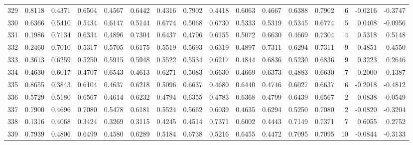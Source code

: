 \begin{tabular}{lrrrrrrrrrrrrrrr}
329 &      0.8118 &  0.4371 &  0.6504 &  0.4567 &  0.6442 &  0.4316 &  0.7902 &  0.4418 &  0.6063 &  0.4667 &   0.6388 &     0.7902 &      6 &                   -0.0216 &                    -0.3747 \\
330 &      0.6366 &  0.5410 &  0.5434 &  0.6147 &  0.5144 &  0.6774 &  0.5068 &  0.6730 &  0.5333 &  0.5319 &   0.5345 &     0.6774 &      5 &                    0.0408 &                    -0.0956 \\
331 &      0.1986 &  0.7134 &  0.6334 &  0.4896 &  0.7304 &  0.6437 &  0.4796 &  0.6155 &  0.5072 &  0.6630 &   0.4669 &     0.7304 &      4 &                    0.5318 &                     0.5148 \\
332 &      0.2460 &  0.7010 &  0.5317 &  0.5705 &  0.6175 &  0.5519 &  0.5693 &  0.6319 &  0.4897 &  0.7311 &   0.6294 &     0.7311 &      9 &                    0.4851 &                     0.4550 \\
333 &      0.3613 &  0.6259 &  0.5250 &  0.5915 &  0.5948 &  0.5522 &  0.5534 &  0.6217 &  0.4844 &  0.6836 &   0.5230 &     0.6836 &      9 &                    0.3223 &                     0.2646 \\
334 &      0.4630 &  0.6017 &  0.4707 &  0.6543 &  0.4613 &  0.6271 &  0.5083 &  0.6630 &  0.4669 &  0.6373 &   0.4883 &     0.6630 &      7 &                    0.2000 &                     0.1387 \\
335 &      0.8655 &  0.3843 &  0.6104 &  0.4637 &  0.6218 &  0.5096 &  0.6637 &  0.4680 &  0.6440 &  0.4746 &   0.6027 &     0.6637 &      6 &                   -0.2018 &                    -0.4812 \\
336 &      0.5729 &  0.5180 &  0.6567 &  0.4614 &  0.6232 &  0.4794 &  0.6355 &  0.4783 &  0.6368 &  0.4799 &   0.6439 &     0.6567 &      2 &                    0.0838 &                    -0.0549 \\
337 &      0.7900 &  0.4696 &  0.7080 &  0.5478 &  0.6181 &  0.5524 &  0.5662 &  0.6039 &  0.4635 &  0.6294 &   0.5250 &     0.7080 &      2 &                   -0.0820 &                    -0.3204 \\
338 &      0.1316 &  0.4068 &  0.3424 &  0.3269 &  0.3115 &  0.4245 &  0.4514 &  0.7371 &  0.6002 &  0.4443 &   0.7149 &     0.7371 &      7 &                    0.6055 &                     0.2752 \\
339 &      0.7939 &  0.4806 &  0.6499 &  0.4580 &  0.6289 &  0.5184 &  0.6738 &  0.5216 &  0.6455 &  0.4472 &   0.7095 &     0.7095 &     10 &                   -0.0844 &                    -0.3133 \\

\end{tabular}
